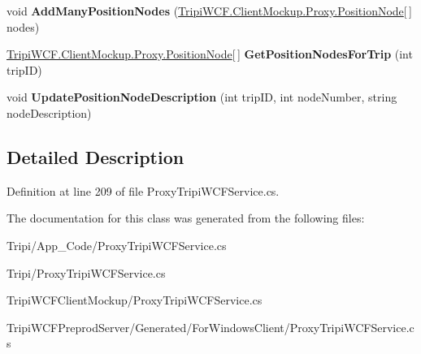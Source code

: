 \begin{DoxyCompactItemize}
\item 
\hypertarget{class_tripi_w_c_f_1_1_client_mockup_1_1_proxy_1_1_trip_service_client_ae4e1deb0bd4735dbe9bd467ad8654638}{
void {\bfseries AddManyPositionNodes} (\hyperlink{class_tripi_w_c_f_1_1_client_mockup_1_1_proxy_1_1_position_node}{TripiWCF.ClientMockup.Proxy.PositionNode}\mbox{[}$\,$\mbox{]} nodes)}
\label{class_tripi_w_c_f_1_1_client_mockup_1_1_proxy_1_1_trip_service_client_ae4e1deb0bd4735dbe9bd467ad8654638}

\item 
\hypertarget{class_tripi_w_c_f_1_1_client_mockup_1_1_proxy_1_1_trip_service_client_a0568d2d0f9aabc3ffd752b7bb7be3a16}{
\hyperlink{class_tripi_w_c_f_1_1_client_mockup_1_1_proxy_1_1_position_node}{TripiWCF.ClientMockup.Proxy.PositionNode}\mbox{[}$\,$\mbox{]} {\bfseries GetPositionNodesForTrip} (int tripID)}
\label{class_tripi_w_c_f_1_1_client_mockup_1_1_proxy_1_1_trip_service_client_a0568d2d0f9aabc3ffd752b7bb7be3a16}

\item 
\hypertarget{class_tripi_w_c_f_1_1_client_mockup_1_1_proxy_1_1_trip_service_client_a4825d8b420f6ddcab725bb2de094771f}{
void {\bfseries UpdatePositionNodeDescription} (int tripID, int nodeNumber, string nodeDescription)}
\label{class_tripi_w_c_f_1_1_client_mockup_1_1_proxy_1_1_trip_service_client_a4825d8b420f6ddcab725bb2de094771f}

\end{DoxyCompactItemize}


\subsection{Detailed Description}


Definition at line 209 of file ProxyTripiWCFService.cs.

The documentation for this class was generated from the following files:\begin{DoxyCompactItemize}
\item 
Tripi/App\_\-Code/ProxyTripiWCFService.cs\item 
Tripi/ProxyTripiWCFService.cs\item 
TripiWCFClientMockup/ProxyTripiWCFService.cs\item 
TripiWCFPreprodServer/Generated/ForWindowsClient/ProxyTripiWCFService.cs\end{DoxyCompactItemize}

